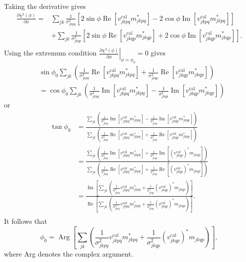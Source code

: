 \documentclass{article}
\newcommand\re{\operatorname{Re}}
\newcommand\im{\operatorname{Im}}
\begin{document}
Taking the derivative gives
\begin{equation}
\begin{split}
\frac{\partial \chi^2(\phi)}{\partial \phi} =& \sum_{jk} \frac{1}{\sigma^2_{jkpq}} \left[2 \sin\phi \re[ v^\text{cal}_{jkpq} m^*_{jkpq}] - 2 \cos\phi \im[ v^\text{cal}_{jkpq} m^*_{jkpq}] \right] \\
&+ \sum_{jk} \frac{1}{\sigma^2_{jkqp}} \left[ 2 \sin\phi \re[v^\text{cal}_{jkqp} m^*_{jkqp}] + 2 \cos\phi \im[v^\text{cal}_{jkqp} m^*_{jkqp}] \right]. \\
\end{split}
\end{equation}
Using the extremum condition $\left. \frac{\partial \chi^2(\phi)}{\partial \phi} \right|_{\phi=\phi_0} = 0$ gives
\begin{equation}
\begin{split}
&\sin\phi_0 \sum_{jk} \left( \frac{1}{\sigma^2_{jkpq}} \re[ v^\text{cal}_{jkpq} m^*_{jkpq}] + \frac{1}{\sigma^2_{jkqp}} \re[v^\text{cal}_{jkqp} m^*_{jkqp}] \right) \\
&= \cos\phi_0 \sum_{jk} \left( \frac{1}{\sigma^2_{jkpq}} \im[ v^\text{cal}_{jkpq} m^*_{jkpq}] - \frac{1}{\sigma^2_{jkqp}} \im[v^\text{cal}_{jkqp} m^*_{jkqp}] \right)
\end{split}
\end{equation}
or
\begin{equation}
\begin{split}
\tan\phi_0 &= \frac{\sum_{jk} \left( \frac{1}{\sigma^2_{jkpq}} \im[ v^\text{cal}_{jkpq} m^*_{jkpq}] - \frac{1}{\sigma^2_{jkqp}} \im[v^\text{cal}_{jkqp} m^*_{jkqp}] \right)}{\sum_{jk} \left( \frac{1}{\sigma^2_{jkpq}} \re[ v^\text{cal}_{jkpq} m^*_{jkpq}] + \frac{1}{\sigma^2_{jkqp}} \re[v^\text{cal}_{jkqp} m^*_{jkqp}] \right)} \\
&= \frac{\sum_{jk} \left( \frac{1}{\sigma^2_{jkpq}} \im[ v^\text{cal}_{jkpq} m^*_{jkpq}] + \frac{1}{\sigma^2_{jkqp}} \im[(v^\text{cal}_{jkqp})^* m_{jkqp}] \right)}{\sum_{jk} \left( \frac{1}{\sigma^2_{jkpq}} \re[ v^\text{cal}_{jkpq} m^*_{jkpq}] + \frac{1}{\sigma^2_{jkqp}} \re[(v^\text{cal}_{jkqp})^* m_{jkqp}]
\right)} \\
&= \frac{\im \left[ \sum_{jk} \left( \frac{1}{\sigma^2_{jkpq}} v^\text{cal}_{jkpq} m^*_{jkpq} + \frac{1}{\sigma^2_{jkqp}} (v^\text{cal}_{jkqp})^* m_{jkqp} \right) \right]}{\re \left[ \sum_{jk} \left( \frac{1}{\sigma^2_{jkpq}} v^\text{cal}_{jkpq} m^*_{jkpq} + \frac{1}{\sigma^2_{jkqp}} (v^\text{cal}_{jkqp})^* m_{jkqp}
\right) \right]}.\\
\end{split}
\end{equation}
It follows that
\begin{equation}
\phi_0 = \operatorname{Arg} \left[ \sum_{jk} \left( \frac{1}{\sigma^2_{jkpq}} v^\text{cal}_{jkpq} m^*_{jkpq} + \frac{1}{\sigma^2_{jkqp}} (v^\text{cal}_{jkqp})^* m_{jkqp} \right) \right],
\end{equation}
where Arg denotes the complex argument.
\end{document}
